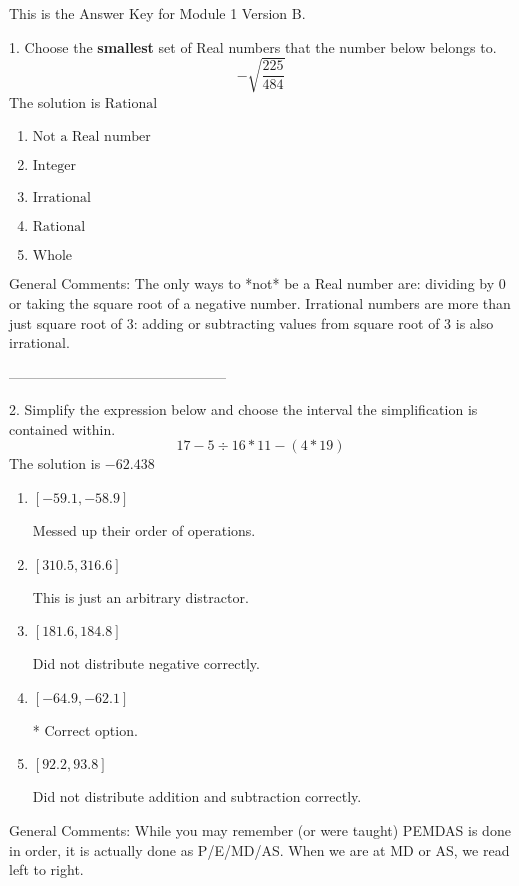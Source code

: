 \documentclass{article}[10pt]
\begin{document}
This is the Answer Key for Module 1 Version B.

1. Choose the \textbf{smallest} set of Real numbers that the number below belongs to.
$$ -\sqrt{\frac{225}{484}} $$ 
The solution is $ \text{Rational} $ 

\begin{enumerate}[label=\Alph*.] 
\item $ \text{Not a Real number} $ 

  
\item $ \text{Integer} $ 

  
\item $ \text{Irrational} $ 

  
\item $ \text{Rational} $ 

  
\item $ \text{Whole} $ 

  
\end{enumerate} 
 
General Comments: The only ways to *not* be a Real number are: dividing by 0 or taking the square root of a negative number. Irrational numbers are more than just square root of 3: adding or subtracting values from square root of 3 is also irrational.

-----------------------------------------------

2. Simplify the expression below and choose the interval the simplification is contained within.
$$ 17 - 5 \div 16 * 11 - (4 * 19) $$ 
The solution is $ -62.438 $ 

\begin{enumerate}[label=\Alph*.] 
\item $ [-59.1, -58.9] $ 

  Messed up their order of operations. 
\item $ [310.5, 316.6] $ 

  This is just an arbitrary distractor. 
\item $ [181.6, 184.8] $ 

  Did not distribute negative correctly. 
\item $ [-64.9, -62.1] $ 

 * Correct option. 
\item $ [92.2, 93.8] $ 

  Did not distribute addition and subtraction correctly. 
\end{enumerate} 
 
General Comments: While you may remember (or were taught) PEMDAS is done in order, it is actually done as P/E/MD/AS. When we are at MD or AS, we read left to right.
\end{document}
